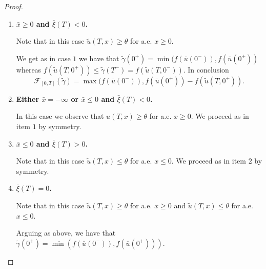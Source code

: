 \documentclass[a4paper, 10pt, final]{article}
\begin{document}
\begin{proof}
\begin{enumerate}
For $\bar x=0$, we observe that   $\widetilde \gamma(0^+)=\min(f(\overline u(0^-), f(\overline u(0^+)) $.  
Then we may proceed as before, getting
\begin{align*}
      \mathcal F_{[0, T]}(\widetilde\gamma)
      & = \widetilde\gamma(0^+)-\widetilde \gamma(T^-)
      + \widetilde\gamma(T^-)-f(\widetilde u(T,0^-))
      + \max(f(\overline u(0^+), f(\overline u(0^-))- \widetilde \gamma(0^+)
      \\
      & = \max(f(\overline u(0^+), f(\overline u(0^-))-f(\widetilde u(T,0^-)).
    \end{align*}
  
    
  \item  {\bf $\bar x \geq 0$ and $\bar \xi(T)<0$.}

Note that in this case  $\widetilde u(T,x)\geq \theta$ for a.e. $x\geq 0$. 

 We get as in case $1$  we have that   $ \widetilde\gamma(0^+)=\min(f(\overline u(0^-)),   f(\overline u(0^+))$ 
 whereas  $f(\widetilde u(T,0^+)) \leq   \widetilde\gamma(T^-)=f(\widetilde u(T,0^-)) $. In conclusion
\begin{equation*}
   \mathcal F_{[0,T]}(\widetilde \gamma)  
    =  \max(f(\overline u(0^-)),   f(\overline u(0^+))- f(\widetilde u(T,0^+)) .
  \end{equation*}
 

  \item  {\bf Either $\bar x=-\infty$ or $\bar x\leq 0$ and $\bar \xi(T)<0$.}
  
  In this  case  we observe that  $u(T,x)\geq \theta$ for a.e. $x\geq 0$. We proceed as in  item $1$ by symmetry.
   
  \item  {\bf $ \bar x\leq  0$ and $\bar \xi(T)>0$.}

Note that in this case  $\widetilde u(T,x)\leq \theta$ for a.e. $x\leq 0$.  We proceed as in item $2$ by symmetry. 


  \item  {\bf   $\bar \xi(T)=0$.}

Note that in this case  $\widetilde u(T,x)\geq \theta$ for a.e. $x\geq 0$ and $\widetilde u(T,x)\leq \theta$ for a.e. $x\leq 0$. 

Arguing as above, we have that   $ \widetilde \gamma(0^+)=\min(f(\overline u(0^-)), f(\overline u(0^+)))$. 

 


\end{enumerate}
\end{proof}
\end{document}
